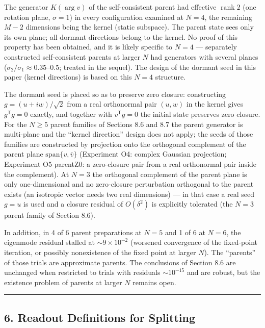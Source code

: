 \documentclass[
  a4paper,
]{article}
\newcounter{none} %
\begin{document}
The generator \(K(\arg v)\) of the self-consistent parent had effective
\(\operatorname{rank}2\) (one rotation plane, \(\sigma=1\)) in every
configuration examined at \(N=4\), the remaining \(M-2\) dimensions
being the kernel (static subspace). The parent state sees only its own
plane; all dormant directions belong to the kernel. No proof of this
property has been obtained, and it is likely specific to \(N=4\) ---
separately constructed self-consistent parents at larger \(N\) had
generators with several planes
(\(\sigma_2/\sigma_1\approx0.35\)--\(0.5\); treated in the sequel). The
design of the dormant seed in this paper (kernel directions) is based on
this \(N=4\) structure.

The dormant seed is placed so as to preserve zero closure: constructing
\(g=(u+iw)/\sqrt2\) from a real orthonormal pair \((u,w)\) in the kernel
gives \(g^{\mathsf T}g=0\) exactly, and together with
\(v^{\mathsf T}g=0\) the initial state preserves zero closure. For the
\(N\ge5\) parent families of Sections 8.6 and 8.7 the parent generator
is multi-plane and the ``kernel direction'' design does not apply; the
seeds of those families are constructed by projection onto the
orthogonal complement of the parent plane \(\mathrm{span}\{v,\bar v\}\)
(Experiment O4: complex Gaussian projection; Experiment O5 parentZ0: a
zero-closure pair from a real orthonormal pair inside the complement).
At \(N=3\) the orthogonal complement of the parent plane is only
one-dimensional and no zero-closure perturbation orthogonal to the
parent exists (an isotropic vector needs two real dimensions) --- in
that case a real seed \(g=u\) is used and a closure residual of
\(O(\delta^2)\) is explicitly tolerated (the \(N=3\) parent family of
Section 8.6).

In addition, in 4 of 6 parent preparations at \(N=5\) and 1 of 6 at
\(N=6\), the eigenmode residual stalled at \(\sim9\times10^{-2}\)
(worsened convergence of the fixed-point iteration, or possibly
nonexistence of the fixed point at larger \(N\)). The ``parents'' of
those trials are approximate parents. The conclusions of Section 8.6 are
unchanged when restricted to trials with residuals \(\sim10^{-15}\) and
are robust, but the existence problem of parents at larger \(N\) remains
open.

\begin{center}\rule{0.5\linewidth}{0.5pt}\end{center}

\subsection{6. Readout Definitions for
Splitting}\label{readout-definitions-for-splitting}
\end{document}
